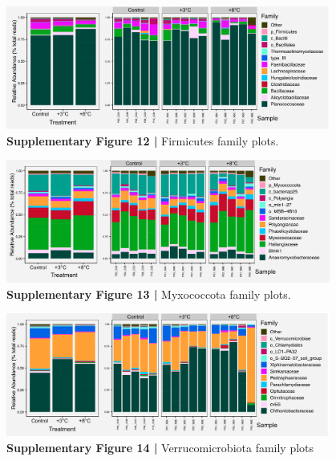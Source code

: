 \documentclass[
  10pt,
  letterpaper,
  DIV=11,
  numbers=noendperiod]{scrartcl}
\begin{document}
\begin{figure}

{\centering \includegraphics[width=0.95\textwidth,height=\textheight]{FIGURES/taxa_plots_class_Firm.png}

}

\caption{\textbf{Supplementary Figure 12 |} Firmicutes family plots.}

\end{figure}

\begin{figure}

{\centering \includegraphics[width=0.95\textwidth,height=\textheight]{FIGURES/taxa_plots_class_Myxo.png}

}

\caption{\textbf{Supplementary Figure 13 |} Myxococcota family plots.}

\end{figure}

\begin{figure}

{\centering \includegraphics[width=0.95\textwidth,height=\textheight]{FIGURES/taxa_plots_class_Verruco.png}

}

\caption{\textbf{Supplementary Figure 14 |} Verrucomicrobiota family
plots}

\end{figure}
\end{document}
